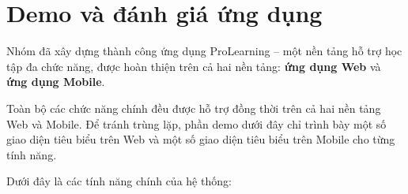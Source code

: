 \section{Demo và đánh giá ứng dụng}

Nhóm đã xây dựng thành công ứng dụng ProLearning -- một nền tảng hỗ trợ học tập đa chức năng, được hoàn thiện trên cả hai nền tảng: \textbf{ứng dụng Web} và \textbf{ứng dụng Mobile}.

Toàn bộ các chức năng chính đều được hỗ trợ đồng thời trên cả hai nền tảng Web và Mobile. Để tránh trùng lặp, phần demo dưới đây chỉ trình bày một số giao diện tiêu biểu trên Web và một số giao diện tiêu biểu trên Mobile cho từng tính năng.

Dưới đây là các tính năng chính của hệ thống:

